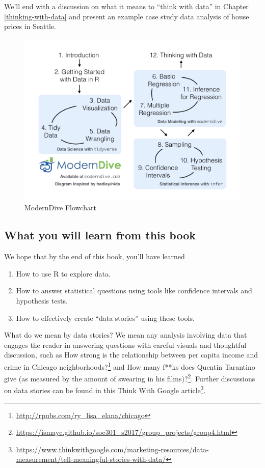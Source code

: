 \documentclass[12pt,]{krantz}
\providecommand{\tightlist}{%
  \setlength{\itemsep}{0pt}\setlength{\parskip}{0pt}}
\renewcommand{\href}[2]{#2\footnote{\url{#1}}}
\begin{document}
We'll end with a discussion on what it means to ``think with data'' in
Chapter \ref{thinking-with-data} and present an example case study data
analysis of house prices in Seattle.

\begin{figure}

{\centering \includegraphics[width=\textwidth]{images/flowcharts/flowchart/flowchart.002} 

}

\caption{ModernDive Flowchart}\label{fig:moderndive-figure}
\end{figure}

\subsection{What you will learn from this
book}\label{subsec:learning-goals}

We hope that by the end of this book, you'll have learned

\begin{enumerate}
\def\labelenumi{\arabic{enumi}.}
\tightlist
\item
  How to use R to explore data.\\
\item
  How to answer statistical questions using tools like confidence
  intervals and hypothesis tests.
\item
  How to effectively create ``data stories'' using these tools.
\end{enumerate}

What do we mean by data stories? We mean any analysis involving data
that engages the reader in answering questions with careful visuals and
thoughtful discussion, such as
\href{http://rpubs.com/ry_lisa_elana/chicago}{How strong is the
relationship between per capita income and crime in Chicago
neighborhoods?} and
\href{https://ismayc.github.io/soc301_s2017/group_projects/group4.html}{How
many f**ks does Quentin Tarantino give (as measured by the amount of
swearing in his films)?}. Further discussions on data stories can be
found in this
\href{https://www.thinkwithgoogle.com/marketing-resources/data-measurement/tell-meaningful-stories-with-data/}{Think
With Google article}.
\end{document}
